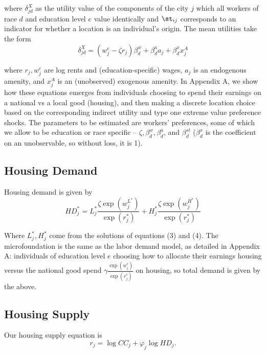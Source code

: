 \documentclass{article}
\begin{document}
where  $\delta_{jd}^X$ as the utility value of the components of the city $j$ which all workers of race $d$ and education level $e$ value identically and $\st_{ij}$ corresponds to an indicator for whether a location is an individual's origin. The mean utilities take the form 
\begin{equation} \delta_{jd}^X = (w_{j}^e - \zeta r_{j})\beta_d^w + \beta^a_d a_{j} + \beta^x_d x_{j}^A \end{equation}

where $r_j, w_j^e$ are log rents and (education-specific) wages, $a_j$ is an endogenous amenity, and $x_j^{A}$ is an (unobserved) exogenous amenity. In Appendix A, we show how  these equations emerges from individuals choosing to spend their earnings on a national vs a local good (housing), and then making a discrete location choice based on the corresponding indirect utility and type one extreme value preference shocks. The parameters to be estimated are workers' preferences, some of which we allow to be education or race specific -- $\zeta, \beta_d^w, \beta_d^a$, and $\beta_d^{st}$ ($\beta_d^x$ is the coefficient on an unobservable, so without loss, it is 1).  

\subsection{Housing Demand}
Housing demand is given by 
\begin{equation} \label{eq: housing demand}  HD_{j}^* = L_{j}^* \frac{\zeta \exp(w_{j}^{L^*})}{\exp(r_{j}^*)} + H_{j}^* \frac{\zeta \exp(w_{j}^{H^*})}{\exp(r_{j}^*)} 
\end{equation}

Where $L_j^*, H_j^*$ come from the solutions of equations (3) and (4). The microfoundation is the same as the labor demand model, as detailed in Appendix A: individuals of education level $e$ choosing how to allocate their earnings housing versus the national good spend $\gamma \frac{\exp(w_j^e)}{\exp(r_j^e)}$ on housing, so total demand is given by the above. 



\subsection{Housing Supply}

Our housing supply equation is \begin{equation}\label{eq: housing supply}
    r_{j} = \log CC_{j} + \varphi_j \log HD_{j}.
\end{equation}
\end{document}
